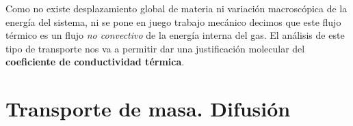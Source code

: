 \documentclass[12pt,a4paper,oneside]{book}
\begin{document}
Como no existe desplazamiento global de materia ni variación macroscópica de la energía del sistema, ni se pone en juego trabajo mecánico decimos que este flujo térmico es un flujo \textit{no convectivo} de la energía interna del gas. El análisis de este tipo de transporte nos va a permitir dar una justificación molecular del \textbf{coeficiente de conductividad térmica}. 

\section{Transporte de masa. Difusión}
\end{document}
